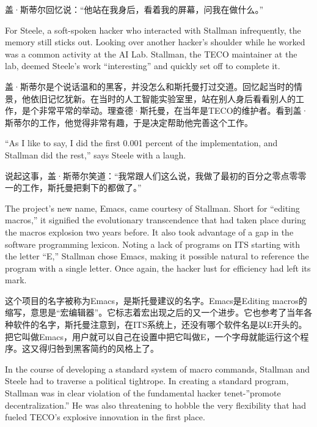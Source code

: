 \ifdefined\chs
盖·斯蒂尔回忆说：``他站在我身后，看着我的屏幕，问我在做什么。''
\fi

\ifdefined\eng
For Steele, a soft-spoken hacker who interacted with Stallman infrequently, the memory still sticks out. Looking over another hacker's shoulder while he worked was a common activity at the AI Lab. Stallman, the TECO maintainer at the lab, deemed Steele's work ``interesting'' and quickly set off to complete it.
\fi

\ifdefined\chs
盖·斯蒂尔是个说话温和的黑客，并没怎么和斯托曼打过交道。回忆起当时的情景，他依旧记忆犹新。在当时的人工智能实验室里，站在别人身后看看别人的工作，是个非常平常的举动。理查德·斯托曼，在当年是TECO的维护者。看到盖·斯蒂尔的工作，他觉得非常有趣，于是决定帮助他完善这个工作。
\fi

\ifdefined\eng
``As I like to say, I did the first 0.001 percent of the implementation, and Stallman did the rest,'' says Steele with a laugh.
\fi

\ifdefined\chs
说起这事，盖·斯蒂尔笑道：``我常跟人们这么说，我做了最初的百分之零点零零一的工作，斯托曼把剩下的都做了。''
\fi

\ifdefined\eng
The project's new name, Emacs, came courtesy of Stallman. Short for ``editing macros,'' it signified the evolutionary transcendence that had taken place during the macros explosion two years before. It also took advantage of a gap in the software programming lexicon. Noting a lack of programs on ITS starting with the letter ``E,'' Stallman chose Emacs, making it \ifdefined\vone possible \fi\ifdefined\vtwo natural \fi to reference the program with a single letter. Once again, the hacker lust for efficiency had left its mark.
\fi

\ifdefined\chs
这个项目的名字被称为Emacs，是斯托曼建议的名字。Emacs是Editing macros的缩写，意思是``宏编辑器''。它标志着宏出现之后的又一个进步。它也参考了当年各种软件的名字，斯托曼注意到，在ITS系统上，还没有哪个软件名是以E开头的。把它叫做Emacs，用户就可以自己在设置中把它叫做E，一个字母就能运行这个程序。这又得归咎到黑客简约的风格上了。
\fi

\ifdefined\vone
\ifdefined\eng
In the course of developing a standard system of macro commands, Stallman and Steele had to traverse a political tightrope. In creating a standard program, Stallman was in clear violation of the fundamental hacker tenet-''promote decentralization.'' He was also threatening to hobble the very flexibility that had fueled TECO's explosive innovation in the first place.
\fi

